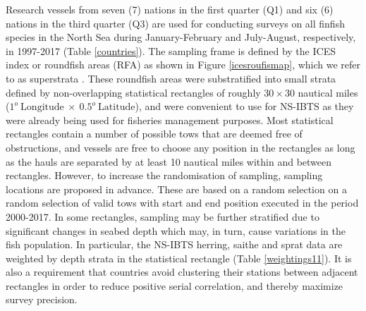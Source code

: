 \documentclass[a4paper 12pt]{article}
\numberwithin{equation}{section}
\begin{document}
\indent Research vessels from seven (7) nations in the first quarter (Q1) and six (6) nations in the third quarter (Q3) are used for conducting surveys on all finfish species in the North Sea during January-February and July-August, respectively, in 1997-2017 (Table \ref{countries}). The sampling frame is defined by the ICES index or roundfish areas (RFA) as shown in Figure \ref{icesroufismap}, which we refer to as superstrata \citep{nottestad2015quantifying, fuller2011sampling}. These  roundfish areas were substratified into small strata defined by non-overlapping statistical rectangles of roughly $30 \times 30$ nautical miles ($1^{o} \  \mathrm{Longitude} \ \times  \  0.5^{o} \ \mathrm{Latitude}$), and were convenient to use for NS-IBTS as they were already being used for fisheries management purposes. Most statistical rectangles contain a number of possible tows that are deemed free of obstructions, and vessels are free to choose any position in the rectangles as long as the hauls are separated by at least 10 nautical miles within and between rectangles. However, to increase the randomisation of sampling, sampling locations are proposed in advance. These are based on a random selection on a random selection of valid tows with start and end position executed in the period 2000-2017. In some rectangles, sampling may be further stratified due to significant changes in seabed depth which may, in turn, cause variations in the fish population. In particular, the NS-IBTS herring, saithe and sprat data are weighted by depth strata in the statistical rectangle (Table \ref{weightings11}). It is also a requirement that countries avoid clustering their stations between adjacent rectangles in order to reduce positive serial correlation, and thereby maximize survey precision. \\
\end{document}
